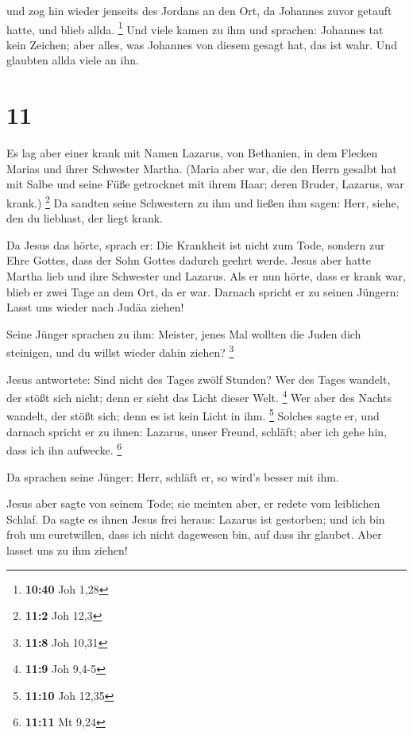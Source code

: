  und zog hin wieder jenseits des Jordans an den Ort, da
Johannes zuvor getauft hatte, und blieb allda. \footnote{\textbf{10:40}
  Joh 1,28}  Und viele kamen zu ihm und sprachen:
Johannes tat kein Zeichen; aber alles, was Johannes von diesem gesagt
hat, das ist wahr.  Und glaubten allda viele an ihn.

\hypertarget{section-10}{%
\section{11}\label{section-10}}

 Es lag aber einer krank mit Namen Lazarus, von Bethanien,
in dem Flecken Marias und ihrer Schwester Martha.  (Maria
aber war, die den Herrn gesalbt hat mit Salbe und seine Füße getrocknet
mit ihrem Haar; deren Bruder, Lazarus, war krank.) \footnote{\textbf{11:2}
  Joh 12,3}  Da sandten seine Schwestern zu ihm und ließen
ihm sagen: Herr, siehe, den du liebhast, der liegt krank.

 Da Jesus das hörte, sprach er: Die Krankheit ist nicht
zum Tode, sondern zur Ehre Gottes, dass der Sohn Gottes dadurch geehrt
werde.  Jesus aber hatte Martha lieb und ihre Schwester
und Lazarus.  Als er nun hörte, dass er krank war, blieb
er zwei Tage an dem Ort, da er war.  Darnach spricht er zu
seinen Jüngern: Lasst uns wieder nach Judäa ziehen!

 Seine Jünger sprachen zu ihm: Meister, jenes Mal wollten
die Juden dich steinigen, und du willst wieder dahin ziehen? \footnote{\textbf{11:8}
  Joh 10,31}

 Jesus antwortete: Sind nicht des Tages zwölf Stunden? Wer
des Tages wandelt, der stößt sich nicht; denn er sieht das Licht dieser
Welt. \footnote{\textbf{11:9} Joh 9,4-5}  Wer aber des
Nachts wandelt, der stößt sich; denn es ist kein Licht in ihm.
\footnote{\textbf{11:10} Joh 12,35}  Solches sagte er,
und darnach spricht er zu ihnen: Lazarus, unser Freund, schläft; aber
ich gehe hin, dass ich ihn aufwecke. \footnote{\textbf{11:11} Mt 9,24}

 Da sprachen seine Jünger: Herr, schläft er, so wird's
besser mit ihm.

 Jesus aber sagte von seinem Tode; sie meinten aber, er
redete vom leiblichen Schlaf.  Da sagte es ihnen Jesus
frei heraus: Lazarus ist gestorben;  und ich bin froh um
euretwillen, dass ich nicht dagewesen bin, auf dass ihr glaubet. Aber
lasset uns zu ihm ziehen!

